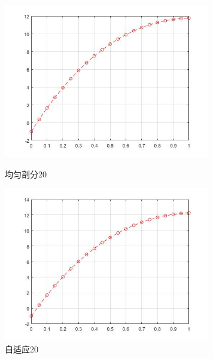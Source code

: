 \documentclass[12pt]{ctexart}
\begin{document}
\begin{figure}[H]
	\centering
	\begin{minipage}[t]{0.48\textwidth}
		\centering
		\includegraphics[width=9cm]{方程三，均匀剖分20.jpg}
		\caption{均匀剖分20}
	\end{minipage}
	\begin{minipage}[t]{0.48\textwidth}
		\centering
		\includegraphics[width=9cm]{方程三，自适应20.jpg}
		\caption{自适应20}
	\end{minipage}
\end{figure}
\end{document}
